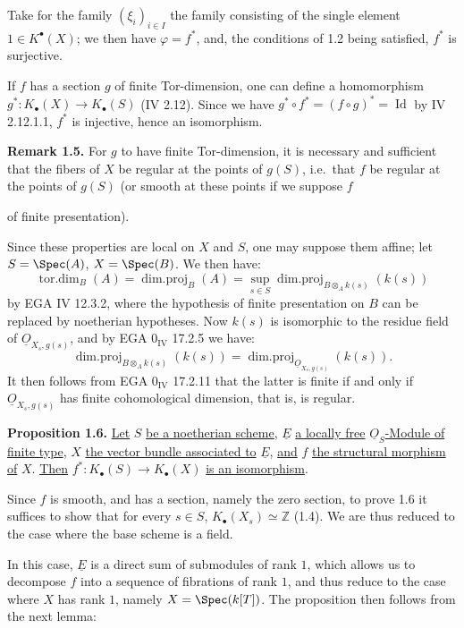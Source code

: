 Take for the family $(\xi_i)_{i\in I}$ the family consisting of the single element $1\in K^{\bullet}(X)$; we then have $\varphi=f^*$, and, the conditions of 1.2 being satisfied, $f^*$ is surjective.

If $f$ has a section $g$ of finite Tor-dimension, one can define a homomorphism $g^*:K_\bullet(X)\to K_\bullet(S)$ (IV 2.12). Since we have $g^*\circ f^*=(f\circ g)^*=\operatorname{Id}$ by IV 2.12.1.1, $f^*$ is injective, hence an isomorphism.

\textbf{Remark 1.5.} For $g$ to have finite Tor-dimension, it is necessary and sufficient that the fibers of $X$ be regular at the points of $g(S)$, i.e.\ that $f$ be regular at the points of $g(S)$ (or smooth at these points if we suppose $f$

%
of finite presentation).

Since these properties are local on $X$ and $S$, one may suppose them affine; let $S=\Spec(A)$, $X=\Spec(B)$. We then have:
\[
\operatorname{tor.dim}_B(A)=\operatorname{dim.proj}_B(A)=\sup_{s\in S}\operatorname{dim.proj}_{B\otimes_A k(s)}(k(s))
\]
by EGA IV 12.3.2, where the hypothesis of finite presentation on $B$ can be replaced by noetherian hypotheses. Now $k(s)$ is isomorphic to the residue field of $\underline{O}_{X_s,g(s)}$, and by EGA $0_{\mathrm{IV}}$ 17.2.5 we have:
\[
\operatorname{dim.proj}_{B\otimes_A k(s)}(k(s))=
\operatorname{dim.proj}_{\underline{O}_{X_s,g(s)}}(k(s)).
\]
It then follows from EGA $0_{\mathrm{IV}}$ 17.2.11 that the latter is finite if and only if $\underline{O}_{X_s,g(s)}$ has finite cohomological dimension, that is, is regular.

\textbf{Proposition 1.6.} \uline{Let} $S$ \uline{be a noetherian scheme}, $\underline{E}$ \uline{a locally free} $\underline{O}_S$\uline{-Module of finite type}, $X$ \uline{the vector bundle associated to} $\underline{E}$, \uline{and} $f$ \uline{the structural morphism of} $X$. \uline{Then} \(f^*:K_\bullet(S)\longrightarrow K_\bullet(X)\) \uline{is an isomorphism}.

Since $f$ is smooth, and has a section, namely the zero section, to prove 1.6 it suffices to show that for every $s\in S$, $K_\bullet(X_s)\simeq \mathbb Z$ (1.4). We are thus reduced to the case where the base scheme is a field.

In this case, $\underline{E}$ is a direct sum of submodules of rank $1$, which allows us to decompose $f$ into a sequence of fibrations of rank $1$, and thus reduce to the case where $X$ has rank $1$, namely $X=\Spec(k[T])$. The proposition then follows from the next lemma:

